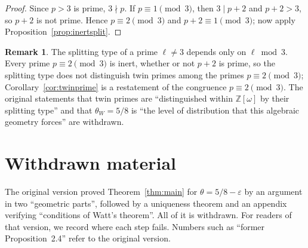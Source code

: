 \documentclass[12pt]{amsart}
\theoremstyle{plain}
\theoremstyle{definition}
\newtheorem{remark}[theorem]{Remark}
\newcommand{\Z}{\mathbb{Z}}
\newcommand{\Zomega}{\Z[\omega]}
\begin{document}
\begin{proof}
Since $p > 3$ is prime, $3 \nmid p$. If $p \equiv 1 \pmod 3$, then
$3 \mid p + 2$ and $p + 2 > 3$, so $p + 2$ is not prime. Hence
$p \equiv 2 \pmod 3$ and $p + 2 \equiv 1 \pmod 3$; now apply
Proposition~\ref{prop:inertsplit}.
\end{proof}

\begin{remark}
The splitting type of a prime $\ell \neq 3$ depends only on $\ell \bmod 3$.
Every prime $p \equiv 2 \pmod 3$ is inert, whether or not $p + 2$ is prime,
so the splitting type does not distinguish twin primes among the primes
$p \equiv 2 \pmod 3$; Corollary~\ref{cor:twinprime} is a restatement of the
congruence $p \equiv 2 \pmod 3$. The original statements that twin primes are
``distinguished within $\Zomega$ by their splitting type'' and that
$\theta_W = 5/8$ is ``the level of distribution that this algebraic geometry
forces'' are withdrawn.
\end{remark}

\section{Withdrawn material}
\label{sec:withdrawn}

The original version proved Theorem~\ref{thm:main} for
$\theta = 5/8 - \varepsilon$ by an argument in two ``geometric parts'',
followed by a uniqueness theorem and an appendix verifying ``conditions of
Watt's theorem''. All of it is withdrawn. For readers of that version, we
record where each step fails. Numbers such as ``former Proposition~2.4''
refer to the original version.
\end{document}
